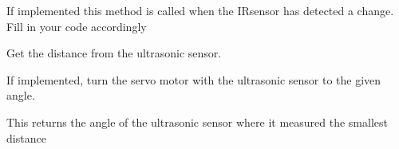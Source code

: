 \documentclass[letterpaper,10pt,english]{sphinxmanual}
\begin{document}
\begin{fulllineitems}
\begin{fulllineitems}
\end{fulllineitems}


\begin{fulllineitems}
\label{\detokenize{autoapi/robotlibrary/robot/index:robotlibrary.robot.Robot.ir_detected}}
\pysigstartsignatures
{}
\pysigstopsignatures
\sphinxAtStartPar
If implemented this method is called when the IR\sphinxhyphen{}sensor has detected a change. Fill in your code accordingly

\end{fulllineitems}


\begin{fulllineitems}
\label{\detokenize{autoapi/robotlibrary/robot/index:robotlibrary.robot.Robot.get_dist}}
\pysigstartsignatures
{}
\pysigstopsignatures
\sphinxAtStartPar
Get the distance from the ultrasonic sensor.

\end{fulllineitems}


\begin{fulllineitems}
\label{\detokenize{autoapi/robotlibrary/robot/index:robotlibrary.robot.Robot.set_angle}}
\pysigstartsignatures
{}
\pysigstopsignatures
\sphinxAtStartPar
If implemented, turn the servo motor with the ultrasonic sensor to the given angle.

\end{fulllineitems}


\begin{fulllineitems}
\label{\detokenize{autoapi/robotlibrary/robot/index:robotlibrary.robot.Robot.get_smallest_distance}}
\pysigstartsignatures
{}
\pysigstopsignatures
\sphinxAtStartPar
This returns the angle of the ultrasonic sensor where it measured the smallest distance


\end{fulllineitems}
\end{fulllineitems}
\end{document}
